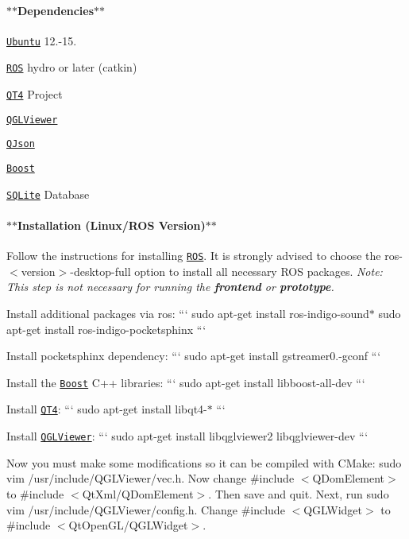 \paragraph*{$\ast$$\ast$\-Dependencies$\ast$$\ast$}


\begin{DoxyItemize}
\item \href{http://www.ubuntu.com/}{\tt Ubuntu} 12.-\/15.
\item \href{http://ros.org/}{\tt R\-O\-S} hydro or later (catkin)
\item \href{http://qt-project.org/}{\tt Q\-T4} Project
\item \href{http://www.libqglviewer.com/}{\tt Q\-G\-L\-Viewer}
\item \href{http://qjson.sourceforge.net/}{\tt Q\-Json}
\item \href{http://www.boost.org/}{\tt Boost}
\item \href{https://sqlite.org/}{\tt S\-Q\-Lite} Database
\end{DoxyItemize}

\paragraph*{$\ast$$\ast$\-Installation (Linux/\-R\-O\-S Version)$\ast$$\ast$}

Follow the instructions for installing \href{http://ros.org/}{\tt R\-O\-S}. It is strongly advised to choose the {\ttfamily ros-\/$<$version$>$-\/desktop-\/full} option to install all necessary R\-O\-S packages. {\itshape Note\-: This step is not necessary for running the {\bfseries frontend} or {\bfseries prototype}.}

Install additional packages via ros\-: ``` sudo apt-\/get install ros-\/indigo-\/sound$\ast$ sudo apt-\/get install ros-\/indigo-\/pocketsphinx ```

Install pocketsphinx dependency\-: ``` sudo apt-\/get install gstreamer0.-\/gconf ```

Install the \href{http://www.boost.org/}{\tt Boost} C++ libraries\-: ``` sudo apt-\/get install libboost-\/all-\/dev ```

Install \href{http://qt-project.org/}{\tt Q\-T4}\-: ``` sudo apt-\/get install libqt4-\/$\ast$ ```

Install \href{http://www.libqglviewer.com/}{\tt Q\-G\-L\-Viewer}\-: ``` sudo apt-\/get install libqglviewer2 libqglviewer-\/dev ```

Now you must make some modifications so it can be compiled with C\-Make\-: {\ttfamily sudo vim /usr/include/\-Q\-G\-L\-Viewer/vec.h}. Now change {\ttfamily \#include $<$Q\-Dom\-Element$>$} to {\ttfamily \#include $<$Qt\-Xml/\-Q\-Dom\-Element$>$}. Then save and quit. Next, run {\ttfamily sudo vim /usr/include/\-Q\-G\-L\-Viewer/config.h}. Change {\ttfamily \#include $<$Q\-G\-L\-Widget$>$} to {\ttfamily \#include $<$Qt\-Open\-G\-L/\-Q\-G\-L\-Widget$>$}.

